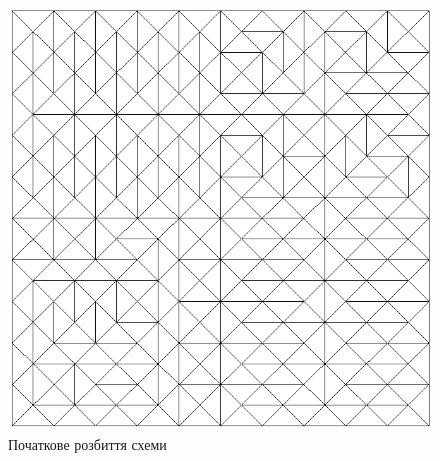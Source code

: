 \begin{figure}[H]
	\centering
    \includegraphics[scale=0.7]{problem1/InitialMesh}
    \caption{Початкове розбиття схеми}
    \label{fig:init_mesh1}
\end{figure}


